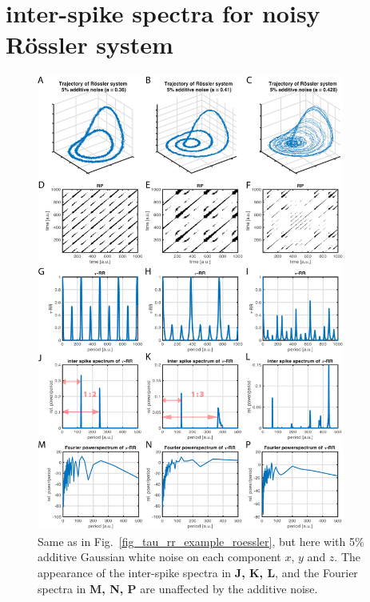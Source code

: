 \documentclass[entropy,article,submit,pdftex,moreauthors]{Definitions/mdpi}
\begin{document}
\clearpage

\section{inter-spike spectra for noisy R\"ossler system}

\begin{figure}[h!]
 \centering
 \includegraphics[width=0.9\textwidth]{./figures/fig_tau_rr_example_roessler_noise}
 \caption{Same as in Fig.~\ref{fig_tau_rr_example_roessler}, but here with 5\% additive Gaussian white noise on each component $x$, $y$ and $z$. The appearance of the inter-spike spectra 
 in \textbf{J, K, L}, and the Fourier spectra in \textbf{M, N, P} are unaffected by the additive noise.}
\label{fig_tau_rr_example_roessler_noise}
\end{figure}

\clearpage 
\end{document}
